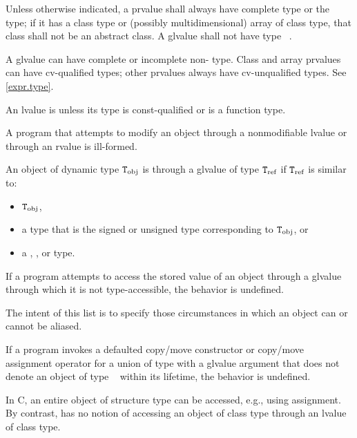 \pnum
Unless otherwise indicated,
a prvalue shall always have complete type or the  type;
if it has a class type or (possibly multidimensional) array of class type,
that class shall not be an abstract class.
A glvalue shall not have type \cv{}~.
\begin{note}
A glvalue can have complete or incomplete non- type.
Class and array prvalues can have cv-qualified types; other prvalues
always have cv-unqualified types. See \ref{expr.type}.
\end{note}

\pnum
An lvalue is  unless its type is const-qualified
or is a function type.
\begin{note}
A program that attempts
to modify an object through a nonmodifiable lvalue or through an rvalue
is ill-formed.
\end{note}

\pnum
An object of dynamic type $\texttt{\protect T}_\text{obj}$ is
 through a glvalue of type $\texttt{\protect T}_\text{ref}$
if $\texttt{\protect T}_\text{ref}$ is similar to:
\begin{itemize}
\item $\texttt{\protect T}_\text{obj}$,

\item a type that is the signed or unsigned type corresponding to $\texttt{\protect T}_\text{obj}$, or

\item a , , or  type.
\end{itemize}
If a program attempts to access
the stored value of an object through a glvalue
through which it is not type-accessible,
the behavior is undefined.
\begin{footnote}
The intent of this list is to specify those circumstances in which an
object can or cannot be aliased.
\end{footnote}
If a program invokes
a defaulted copy/move constructor or copy/move assignment operator
for a union of type  with a glvalue argument
that does not denote an object of type \cv{}~ within its lifetime,
the behavior is undefined.
\begin{note}
In C, an entire object of structure type can be accessed, e.g., using assignment.
By contrast, \Cpp{} has no notion of accessing an object of class type
through an lvalue of class type.
\end{note}

